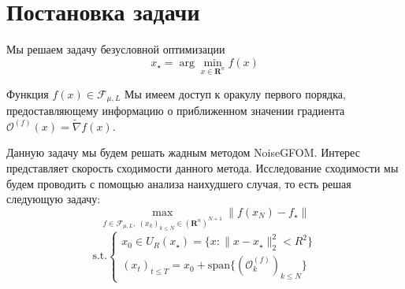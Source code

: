 \documentclass{article}
\begin{document}

\section{Постановка задачи}
Мы решаем задачу безусловной оптимизации 
\begin{equation} \label{opt_problem}
    x_{\star} = \arg \min_{x \in \mathbf{R}^n} f(x)
\end{equation}

Функция $f(x) \in \mathcal{F}_{\mu, L}$ 
Мы имеем доступ к оракулу первого порядка, предоставляющему информацию о приближенном значении градиента $\mathcal{O}^{(f)} (x) = \widetilde{\nabla} f(x)$. 

Данную задачу мы будем решать жадным методом NoiseGFOM. Интерес представляет скорость сходимости данного метода. Исследование сходимости мы будем проводить с помощью анализа наихудшего случая, то есть решая следующую задачу:
\begin{equation}
    \max_{f \in \mathcal{F}_{\mu, L}, \ (x_k)_{k \le N} \in (\mathbf{R}^n)^{N+1}} \|f(x_N) - f_{\star}\|  
\end{equation}
    \[\text{s.t.} 
    \begin{cases}
    x_0 \in U_R(x_{\star}) = \{x: \|x-x_{\star}\|_2^2 < R^2\} \\
    (x_t)_{t \le T} = x_0 + \text{span} \{ (\mathcal{O}^{(f)}_{k})_{k \le N} \}
\end{cases}\]
\end{document}
